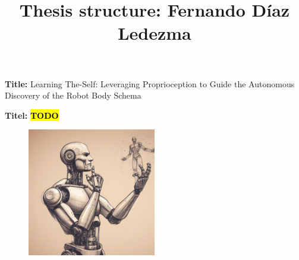 \documentclass[12pt, a4paper]{article}
\title{Thesis structure: Fernando Díaz Ledezma}
\author{}
\date{}
\newcommand{\namelistlabel}[1]{\mbox{#1}	\hfil}
\newcommand{\TODO}{\hl{\textbf{TODO}}}
\newenvironment{namelist}[1]{%
\begin{list}{}
    {
        \let\makelabel\namelistlabel
        \settowidth{\labelwidth}{#1}
        \setlength{\leftmargin}{1.1\labelwidth}
    }
  }{%
\end{list}}
\begin{document}
\maketitle

\begin{namelist}{xxxxxxxxxxxx}
\item[{\bf Title:}]
	Learning The-Self: Leveraging Proprioception to Guide the Autonomous Discovery of the Robot Body Schema

\item[{\bf Titel:}]
\TODO
\end{namelist}


\begin{figure}[h!]
	\begin{center}
	\includegraphics[width=0.5\textwidth]{concept_art.jpeg}
	\end{center}
\end{figure}
\end{document}
